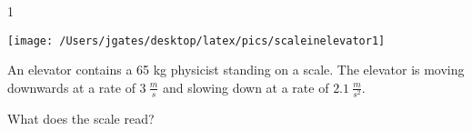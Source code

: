 
\AddToShipoutPicture*{\BackgroundPic}

\addtocounter {ProbNum} {1}

\begin{floatingfigure}[r]{.2\textwidth}
\texttt{[image: /Users/jgates/desktop/latex/pics/scaleinelevator1]}
\end{floatingfigure}
 
{\bf \Large{}} An elevator contains a 65 kg physicist standing on a scale. The elevator is moving downwards at a rate of ${3~\tfrac{m}{s}}$ and slowing down at a rate of ${2.1~\tfrac{m}{s^2}}$.

\bigskip
What does the scale read?




\vfill
\newpage
